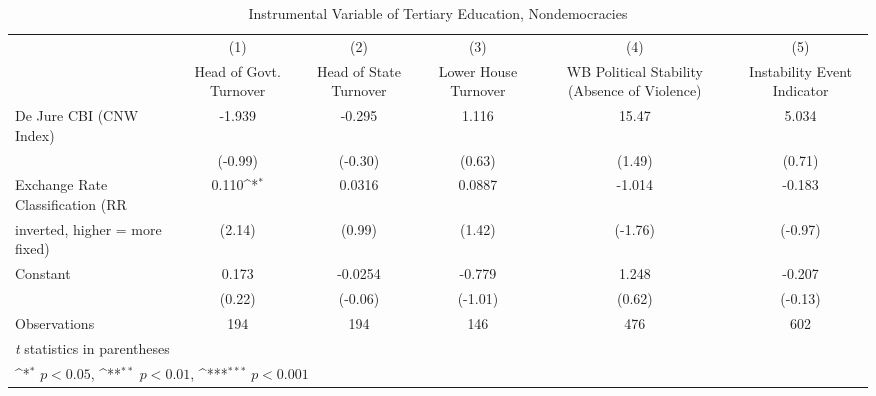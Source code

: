 \begin{table}[htbp]\centering
\def\sym#1{\ifmmode^{#1}\else\(^{#1}\)\fi}
\caption{Instrumental Variable of Tertiary Education, Nondemocracies \label{ndemIfivs}}
\begin{tabular}{l*{5}{c}}
\toprule
                                        &\multicolumn{1}{c}{(1)}&\multicolumn{1}{c}{(2)}&\multicolumn{1}{c}{(3)}&\multicolumn{1}{c}{(4)}&\multicolumn{1}{c}{(5)}\\
                                        &\multicolumn{1}{c}{Head of Govt. Turnover}&\multicolumn{1}{c}{Head of State Turnover}&\multicolumn{1}{c}{Lower House Turnover}&\multicolumn{1}{c}{WB Political Stability (Absence of Violence)}&\multicolumn{1}{c}{Instability Event Indicator}\\
\midrule
De Jure CBI (CNW Index)                 &   -1.939         &   -0.295         &    1.116         &    15.47         &    5.034         \\
                                        &  (-0.99)         &  (-0.30)         &   (0.63)         &   (1.49)         &   (0.71)         \\
\addlinespace
Exchange Rate Classification (RR        &    0.110\sym{*}  &   0.0316         &   0.0887         &   -1.014         &   -0.183         \\
inverted, higher = more fixed)          &   (2.14)         &   (0.99)         &   (1.42)         &  (-1.76)         &  (-0.97)         \\
\addlinespace
Constant                                &    0.173         &  -0.0254         &   -0.779         &    1.248         &   -0.207         \\
                                        &   (0.22)         &  (-0.06)         &  (-1.01)         &   (0.62)         &  (-0.13)         \\
\midrule
Observations                            &      194         &      194         &      146         &      476         &      602         \\
\bottomrule
\multicolumn{6}{l}{\footnotesize \textit{t} statistics in parentheses}\\
\multicolumn{6}{l}{\footnotesize \sym{*} \(p<0.05\), \sym{**} \(p<0.01\), \sym{***} \(p<0.001\)}\\
\end{tabular}
\end{table}
